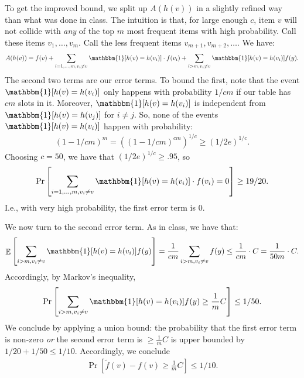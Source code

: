 \documentclass[11pt]{article}
\DeclareMathOperator*{\E}{\mathbb{E}}
\begin{document}
To get the improved bound, we split up  $A(h(v))$ in a slightly refined way than what was done in class. The intuition is that, for large enough $c$, item $v$ will not collide with \emph{any} of the top $m$ most frequent items with high probability. Call these items $v_1, \ldots, v_m$. Call the less frequent items $v_{m+1}, v_{m+2}, \ldots$. We have:
\begin{align*}
	A(h(v)) = f(v) + \sum_{i=1,\ldots, m, v_i \neq v}\mathbbm{1}[h(v) = h(v_i)]\cdot f(v_i) + \sum_{i> m, v_i \neq v}\mathbbm{1}[h(v) = h(v_i)] f(y).
\end{align*}
The second two terms are our error terms. To bound the first, note that the event $\mathbbm{1}[h(v) = h(v_i)]$ only happens with probability $1/cm$ if our table has $cm$ slots in it. Moreover, $\mathbbm{1}[h(v) = h(v_i)]$ is independent from $\mathbbm{1}[h(v) = h(v_j)]$ for $i \neq j$. So, none of the events $\mathbbm{1}[h(v) = h(v_i)]$ happen with probability:
\begin{align*}
	(1 - 1/cm)^m = \left((1 - 1/cm)^{cm}\right)^{1/c}  \geq (1/2e)^{1/c}. 
\end{align*}
Choosing $c = 50$, we have that $(1/2e)^{1/c} \geq .95$, so
\begin{align*}
	\Pr\left[\sum_{i=1,\ldots, m, v_i \neq v}\mathbbm{1}[h(v) = h(v_i)]\cdot f(v_i) = 0\right] \geq 19/20. 
\end{align*}
I.e., with very high probability, the first error term is $0$. 

We now turn to the second error term. As in class, we have that: 
\begin{align*}
\E\left[\sum_{i> m, v_i \neq v}\mathbbm{1}[h(v) = h(v_i)] f(y)\right] = \frac{1}{cm} \sum_{i> m, v_i \neq v} f(y) \leq \frac{1}{cm}\cdot C = \frac{1}{50m}\cdot C.
\end{align*}
Accordingly, by Markov's inequality, 
\begin{align*}
\Pr\left[\sum_{i> m, v_i \neq v}\mathbbm{1}[h(v) = h(v_i)] f(y) \geq \frac{1}{m}C\right] \leq 1/50. 
\end{align*}
We conclude by applying a union bound: the probability that the first error term is non-zero \textit{or} the second error term is $\geq \frac{1}{m} C$ is upper bounded by $1/20 + 1/50 \leq 1/10$. Accordingly, we conclude
\begin{align*}
\Pr\left[\tilde{f}(v) -f(v) \geq \frac{1}{m}C\right] \leq 1/10.
\end{align*}
\end{document}
